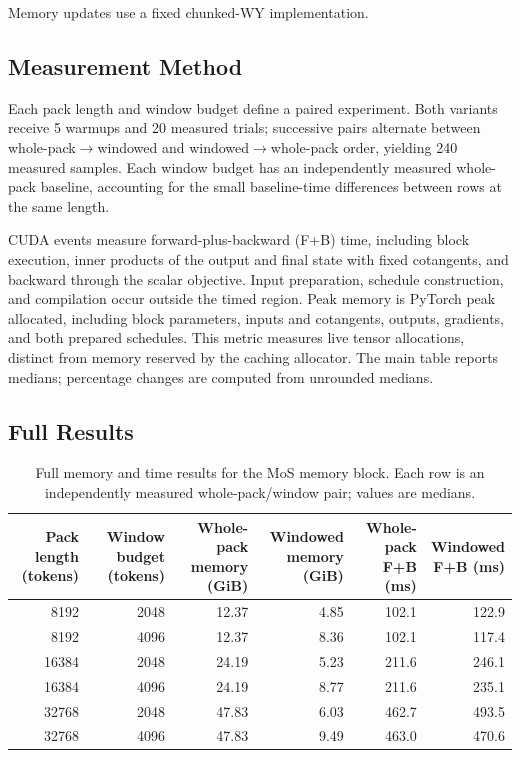 Memory updates use a fixed chunked-WY implementation.

\subsection{Measurement Method}

Each pack length and window budget define a paired experiment.
Both variants receive 5 warmups and 20 measured trials; successive pairs alternate between whole-pack$\rightarrow$windowed and windowed$\rightarrow$whole-pack order, yielding 240 measured samples.
Each window budget has an independently measured whole-pack baseline, accounting for the small baseline-time differences between rows at the same length.

CUDA events measure forward-plus-backward (F+B) time, including block execution, inner products of the output and final state with fixed cotangents, and backward through the scalar objective.
Input preparation, schedule construction, and compilation occur outside the timed region.
Peak memory is PyTorch peak allocated, including block parameters, inputs and cotangents, outputs, gradients, and both prepared schedules.
This metric measures live tensor allocations, distinct from memory reserved by the caching allocator.
The main table reports medians; percentage changes are computed from unrounded medians.

\subsection{Full Results}

\begin{table}[htbp]
    \centering
    \caption{Full memory and time results for the MoS memory block.
    Each row is an independently measured whole-pack/window pair; values are medians.}
    \label{tab:infra_window_full_results}
    \small
    \setlength{\tabcolsep}{5pt}
    \renewcommand{\arraystretch}{1.12}
    \begin{tabular}{rrrrrr}
        \toprule
        \makecell{Pack length\\(tokens)} & \makecell{Window budget\\(tokens)} & \makecell{Whole-pack\\memory (GiB)} & \makecell{Windowed\\memory (GiB)} & \makecell{Whole-pack\\F+B (ms)} & \makecell{Windowed\\F+B (ms)} \\
        \midrule
        8192 & 2048 & 12.37 & 4.85 & 102.1 & 122.9 \\
        8192 & 4096 & 12.37 & 8.36 & 102.1 & 117.4 \\
        16384 & 2048 & 24.19 & 5.23 & 211.6 & 246.1 \\
        16384 & 4096 & 24.19 & 8.77 & 211.6 & 235.1 \\
        32768 & 2048 & 47.83 & 6.03 & 462.7 & 493.5 \\
        32768 & 4096 & 47.83 & 9.49 & 463.0 & 470.6 \\
        \bottomrule
    \end{tabular}
\end{table}

